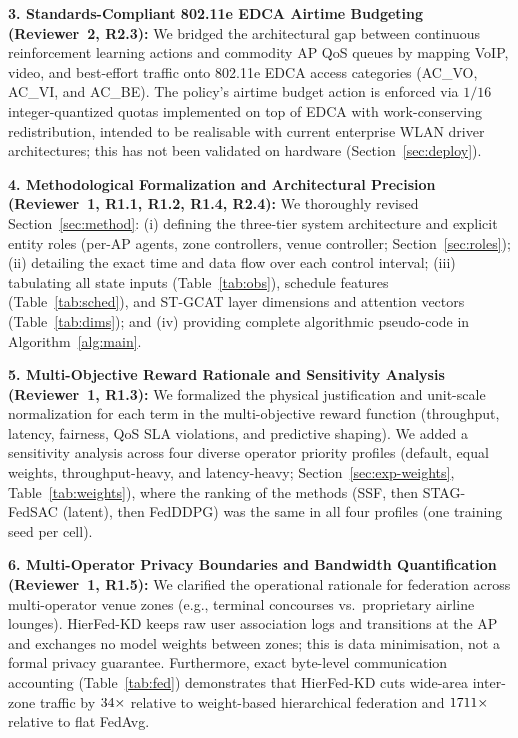 \documentclass[11pt,a4paper]{article}
\begin{document}
\textbf{3. Standards-Compliant 802.11e EDCA Airtime Budgeting (Reviewer~2, R2.3):} 
We bridged the architectural gap between continuous reinforcement learning actions and commodity AP QoS queues by mapping VoIP, video, and best-effort traffic onto 802.11e EDCA access categories (AC\_VO, AC\_VI, and AC\_BE). The policy's airtime budget action is enforced via $1/16$ integer-quantized quotas implemented on top of EDCA with work-conserving redistribution, intended to be realisable with current enterprise WLAN driver architectures; this has not been validated on hardware (Section~\ref{sec:deploy}).

\textbf{4. Methodological Formalization and Architectural Precision (Reviewer~1, R1.1, R1.2, R1.4, R2.4):} 
We thoroughly revised Section~\ref{sec:method}: (i) defining the three-tier system architecture and explicit entity roles (per-AP agents, zone controllers, venue controller; Section~\ref{sec:roles}); (ii) detailing the exact time and data flow over each control interval; (iii) tabulating all state inputs (Table~\ref{tab:obs}), schedule features (Table~\ref{tab:sched}), and ST-GCAT layer dimensions and attention vectors (Table~\ref{tab:dims}); and (iv) providing complete algorithmic pseudo-code in Algorithm~\ref{alg:main}.

\textbf{5. Multi-Objective Reward Rationale and Sensitivity Analysis (Reviewer~1, R1.3):} 
We formalized the physical justification and unit-scale normalization for each term in the multi-objective reward function (throughput, latency, fairness, QoS SLA violations, and predictive shaping). We added a sensitivity analysis across four diverse operator priority profiles (default, equal weights, throughput-heavy, and latency-heavy; Section~\ref{sec:exp-weights}, Table~\ref{tab:weights}), where the ranking of the methods (SSF, then STAG-FedSAC (latent), then FedDDPG) was the same in all four profiles (one training seed per cell).

\textbf{6. Multi-Operator Privacy Boundaries and Bandwidth Quantification (Reviewer~1, R1.5):} 
We clarified the operational rationale for federation across multi-operator venue zones (e.g., terminal concourses vs.\ proprietary airline lounges). HierFed-KD keeps raw user association logs and transitions at the AP and exchanges no model weights between zones; this is data minimisation, not a formal privacy guarantee. Furthermore, exact byte-level communication accounting (Table~\ref{tab:fed}) demonstrates that HierFed-KD cuts wide-area inter-zone traffic by $34\times$ relative to weight-based hierarchical federation and $1711\times$ relative to flat FedAvg.
\end{document}
